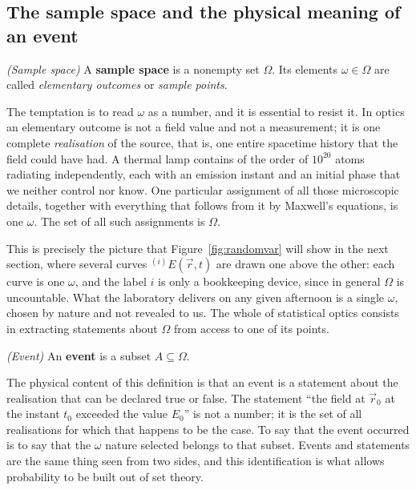 	\subsection{The sample space and the physical meaning of an event}

		\begin{myDef}
			\textit{(Sample space)} A \textbf{sample space} is a nonempty set $\Omega$. Its
			elements $\omega\in\Omega$ are called \emph{elementary outcomes} or
			\emph{sample points}.
		\end{myDef}

		The temptation is to read $\omega$ as a number, and it is essential to resist it. In
		optics an elementary outcome is not a field value and not a measurement; it is one
		complete \emph{realisation} of the source, that is, one entire spacetime history that
		the field could have had. A thermal lamp contains of the order of $10^{20}$ atoms
		radiating independently, each with an emission instant and an initial phase that we
		neither control nor know. One particular assignment of all those microscopic details,
		together with everything that follows from it by Maxwell's equations, is one $\omega$.
		The set of all such assignments is $\Omega$.

		This is precisely the picture that Figure~\ref{fig:randomvar} will show in the next
		section, where several curves $^{(i)}E(\vec{r},t)$ are drawn one above the other: each
		curve is one $\omega$, and the label $i$ is only a bookkeeping device, since in general
		$\Omega$ is uncountable. What the laboratory delivers on any given afternoon is a single
		$\omega$, chosen by nature and not revealed to us. The whole of statistical optics
		consists in extracting statements about $\Omega$ from access to one of its points.

		\begin{myDef}
			\textit{(Event)} An \textbf{event} is a subset $A\subseteq\Omega$.
		\end{myDef}

		The physical content of this definition is that an event is a statement about
		the realisation that can be declared true or false. The statement ``the field at
		$\vec{r}_{0}$ at the instant $t_{0}$ exceeded the value $E_{0}$'' is not a number; it is
		the set of all realisations for which that happens to be the case. To say that the event
		occurred is to say that the $\omega$ nature selected belongs to that subset. Events and
		statements are the same thing seen from two sides, and this identification is what
		allows probability to be built out of set theory.

